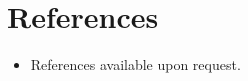\documentclass[letterpaper,11pt]{article}
\newcommand{\resumeSubHeadingListStart}{\begin{itemize}[leftmargin=0.15in, label={}]}
\newcommand{\resumeSubHeadingListEnd}{\end{itemize}}
\begin{document}
        

\section{References}
  \vspace{2pt}
  \resumeSubHeadingListStart
    \item{References available upon request.}
  \resumeSubHeadingListEnd

\end{document}
